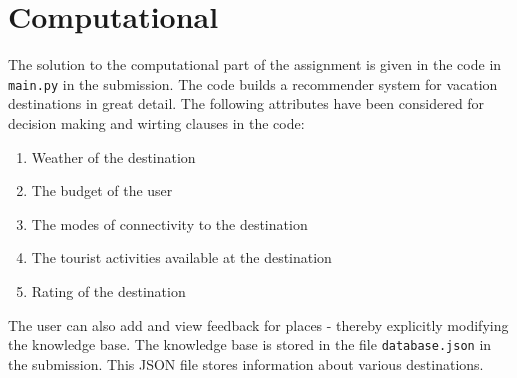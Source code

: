 \documentclass[12pt]{article}
\begin{document}
    \section*{Computational}
    The solution to the computational part of the assignment is given in the code in \texttt{main.py} in the submission.
    The code builds a recommender system for vacation destinations in great detail. The following attributes have been
    considered for decision making and wirting clauses in the code:
    \begin{enumerate}
        \item Weather of the destination
        \item The budget of the user
        \item The modes of connectivity to the destination
        \item The tourist activities available at the destination
        \item Rating of the destination
    \end{enumerate}
    The user can also add and view feedback for places - thereby explicitly modifying the
    knowledge base. The knowledge base is stored in the file \texttt{database.json} in the submission.
    This JSON file stores information about various destinations.
\end{document}

